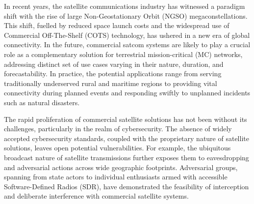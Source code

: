 \documentclass[english, 12pt, a4paper, elec, utf8, a-1b, online]{aaltothesis}
\date{31.12.2023}
\begin{document}
\makecoverpage

\makecopyrightpage


\begin{abstractpage}[english]
  In recent years, the satellite communications industry has witnessed a paradigm shift with the rise of large Non-Geostationary Orbit (NGSO) megaconstellations. This shift, fuelled by reduced space launch costs and the widespread use of Commercial Off-The-Shelf (COTS) technology, has ushered in a new era of global connectivity. In the future, commercial satcom systems are likely to play a crucial role as a complementary solution for terrestrial mission-critical (MC) networks, addressing distinct set of use cases varying in their nature, duration, and forecastability. In practice, the potential applications range from serving traditionally underserved rural and maritime regions to providing vital connectivity during planned events and responding swiftly to unplanned incidents such as natural disasters.

  The rapid proliferation of commercial satellite solutions has not been without its challenges, particularly in the realm of cybersecurity. The absence of widely accepted cybersecurity standards, coupled with the proprietary nature of satellite solutions, leaves open potential vulnerabilities. For example, the ubiquitous broadcast nature of satellite transmissions further exposes them to eavesdropping and adversarial actions across wide geographic footprints. Adversarial groups, spanning from state actors to individual enthusiasts armed with accessible Software-Defined Radios (SDR), have demonstrated the feasibility of interception and deliberate interference with commercial satellite systems.


\end{abstractpage}
\end{document}
